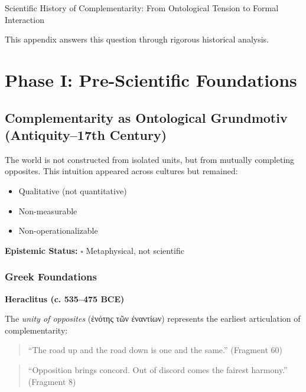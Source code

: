 \begin{chapter}{Scientific History of Complementarity: From Ontological Tension to Formal Interaction}
\begin{tcolorbox}[colback=red!5!white,colframe=red!75!black,title=\textbf{Fundamental Question}]
This appendix answers this question through rigorous historical analysis.
\end{tcolorbox}

\section{Phase I: Pre-Scientific Foundations}
\label{sec:phase-i}

\subsection{Complementarity as Ontological Grundmotiv (Antiquity--17th Century)}

\begin{tcolorbox}[colback=purple!5!white,colframe=purple!75!black,title=\textbf{Core Thesis}]
The world is not constructed from isolated units, but from mutually completing opposites. This intuition appeared across cultures but remained:
\begin{itemize}[noitemsep]
    \item Qualitative (not quantitative)
    \item Non-measurable
    \item Non-operationalizable
\end{itemize}
\textbf{Epistemic Status:} $\square$ Metaphysical, not scientific
\end{tcolorbox}

\subsubsection{Greek Foundations}

\textbf{Heraclitus (c. 535--475 BCE)}

The \textit{unity of opposites} (\textgreek{ἑνότης τῶν ἐναντίων}) represents the earliest articulation of complementarity:

\begin{quote}
``The road up and the road down is one and the same.'' (Fragment 60)
\end{quote}

\begin{quote}
``Opposition brings concord. Out of discord comes the fairest harmony.'' (Fragment 8)
\end{quote}


\end{chapter}
